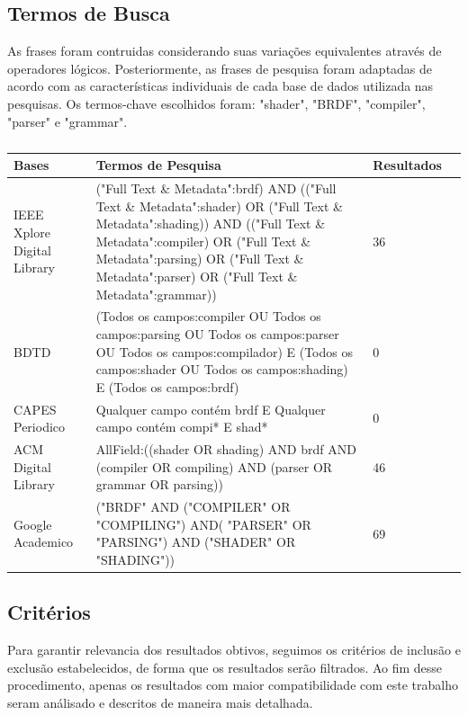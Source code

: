 \documentclass[english, 
               brazil, 
               bsc] %
               {dcomp-abntex2}
\begin{document}
\subsection{Termos de Busca}
 As frases foram contruidas considerando suas variações equivalentes através de operadores lógicos. Posteriormente, as frases de pesquisa foram adaptadas de acordo com as características individuais de cada base de dados utilizada nas pesquisas. Os termos-chave escolhidos foram: "shader", "BRDF", "compiler", "parser" e "grammar".


\begin{table}[H]
\ABNTEXfontereduzida
\caption[bases]{}
\label{tab-bases}
\begin{tabular}{p{2.6cm}|p{6.0cm}|p{2.25cm}|p{3.40cm}}
   \textbf{Bases} & \textbf{Termos de Pesquisa}  & \textbf{Resultados}\\
   \hline
    IEEE Xplore Digital Library
    &
    ("Full Text \& Metadata":brdf)
AND (("Full Text \& Metadata":shader) OR  ("Full Text \& Metadata":shading))
AND (("Full Text \& Metadata":compiler) OR  ("Full Text \& Metadata":parsing) OR  ("Full Text \& Metadata":parser) OR  ("Full Text \& Metadata":grammar))
   & 36
    \\ \hline

    BDTD
    & (Todos os campos:compiler OU Todos os campos:parsing OU Todos os campos:parser OU Todos os campos:compilador) E (Todos os campos:shader OU Todos os campos:shading) E (Todos os campos:brdf)
    & 0
    \\ \hline
    CAPES Periodico
    &  Qualquer campo contém brdf E 
 Qualquer campo contém compi* E shad*  
    & 0
    \\ \hline

  ACM Digital Library
  & AllField:((shader OR shading) AND brdf AND (compiler OR compiling) AND (parser OR grammar OR parsing))
  & 46
    \\ \hline

 Google Academico 
  & 
  ("BRDF" AND ("COMPILER" OR "COMPILING") AND( "PARSER" OR "PARSING") AND ("SHADER" OR "SHADING"))
  & 69
\end{tabular}
\end{table}

\subsection{Critérios}

Para garantir relevancia dos resultados obtivos, seguimos os critérios de inclusão e exclusão estabelecidos, de forma que os resultados serão filtrados. Ao fim desse procedimento, apenas os resultados com maior compatibilidade com este trabalho seram análisado e descritos de maneira mais detalhada.
\end{document}
